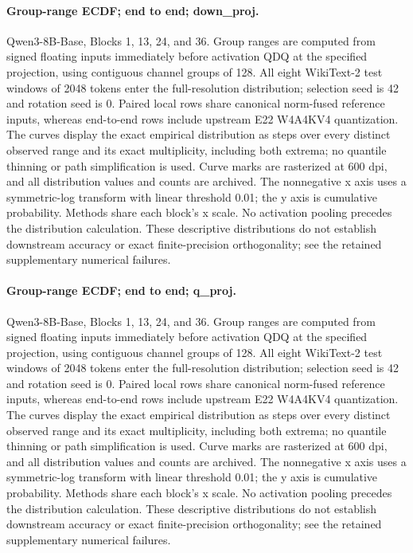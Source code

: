\paragraph{Group-range ECDF; end to end; down\_proj.} Qwen3-8B-Base, Blocks 1, 13, 24, and 36. Group ranges are computed from signed floating inputs immediately before activation QDQ at the specified projection, using contiguous channel groups of 128. All eight WikiText-2 test windows of 2048 tokens enter the full-resolution distribution; selection seed is 42 and rotation seed is 0. Paired local rows share canonical norm-fused reference inputs, whereas end-to-end rows include upstream E22 W4A4KV4 quantization. The curves display the exact empirical distribution as steps over every distinct observed range and its exact multiplicity, including both extrema; no quantile thinning or path simplification is used. Curve marks are rasterized at 600 dpi, and all distribution values and counts are archived. The nonnegative x axis uses a symmetric-log transform with linear threshold 0.01; the y axis is cumulative probability. Methods share each block's x scale. No activation pooling precedes the distribution calculation. These descriptive distributions do not establish downstream accuracy or exact finite-precision orthogonality; see the retained supplementary numerical failures.

\paragraph{Group-range ECDF; end to end; q\_proj.} Qwen3-8B-Base, Blocks 1, 13, 24, and 36. Group ranges are computed from signed floating inputs immediately before activation QDQ at the specified projection, using contiguous channel groups of 128. All eight WikiText-2 test windows of 2048 tokens enter the full-resolution distribution; selection seed is 42 and rotation seed is 0. Paired local rows share canonical norm-fused reference inputs, whereas end-to-end rows include upstream E22 W4A4KV4 quantization. The curves display the exact empirical distribution as steps over every distinct observed range and its exact multiplicity, including both extrema; no quantile thinning or path simplification is used. Curve marks are rasterized at 600 dpi, and all distribution values and counts are archived. The nonnegative x axis uses a symmetric-log transform with linear threshold 0.01; the y axis is cumulative probability. Methods share each block's x scale. No activation pooling precedes the distribution calculation. These descriptive distributions do not establish downstream accuracy or exact finite-precision orthogonality; see the retained supplementary numerical failures.
